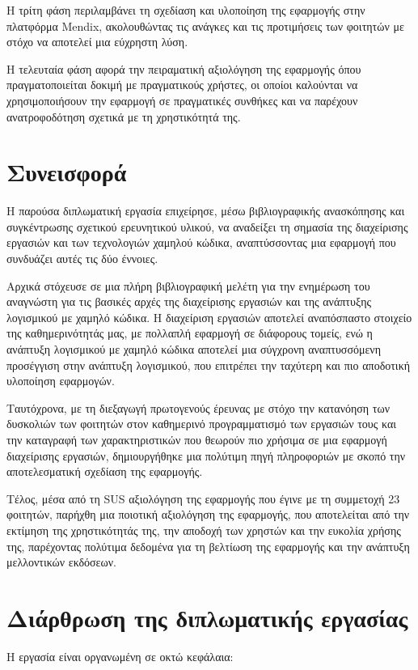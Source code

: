 		Η τρίτη φάση περιλαμβάνει τη σχεδίαση και υλοποίηση της εφαρμογής στην πλατφόρμα Mendix, ακολουθώντας τις ανάγκες και τις προτιμήσεις των φοιτητών με στόχο να αποτελεί μια εύχρηστη λύση.

		Η τελευταία φάση αφορά την πειραματική αξιολόγηση της εφαρμογής όπου πραγματοποιείται δοκιμή με πραγματικούς χρήστες, οι οποίοι καλούνται να χρησιμοποιήσουν την εφαρμογή σε πραγματικές συνθήκες και να παρέχουν ανατροφοδότηση σχετικά με τη χρηστικότητά της.


	\section{Συνεισφορά}
		Η παρούσα διπλωματική εργασία επιχείρησε, μέσω βιβλιογραφικής ανασκόπησης και συγκέντρωσης σχετικού ερευνητικού υλικού, να αναδείξει τη σημασία της διαχείρισης εργασιών και των τεχνολογιών χαμηλού κώδικα, αναπτύσσοντας μια εφαρμογή που συνδυάζει αυτές τις δύο έννοιες.

		Αρχικά στόχευσε σε μια πλήρη βιβλιογραφική μελέτη για την ενημέρωση του αναγνώστη για τις βασικές αρχές της διαχείρισης εργασιών και της ανάπτυξης λογισμικού με χαμηλό κώδικα. Η διαχείριση εργασιών αποτελεί αναπόσπαστο στοιχείο της καθημερινότητάς μας, με πολλαπλή εφαρμογή σε διάφορους τομείς, ενώ η ανάπτυξη λογισμικού με χαμηλό κώδικα αποτελεί μια σύγχρονη αναπτυσσόμενη προσέγγιση στην ανάπτυξη λογισμικού, που επιτρέπει την ταχύτερη και πιο αποδοτική υλοποίηση εφαρμογών.

		Ταυτόχρονα, με τη διεξαγωγή πρωτογενούς έρευνας με στόχο την κατανόηση των δυσκολιών των φοιτητών στον καθημερινό προγραμματισμό των εργασιών τους και την καταγραφή των χαρακτηριστικών που θεωρούν πιο χρήσιμα σε μια εφαρμογή διαχείρισης εργασιών, δημιουργήθηκε μια πολύτιμη πηγή πληροφοριών με σκοπό την αποτελεσματική σχεδίαση της εφαρμογής.

		Τέλος, μέσα από τη SUS αξιολόγηση της εφαρμογής που έγινε με τη συμμετοχή 23 φοιτητών, παρήχθη μια ποιοτική αξιολόγηση της εφαρμογής, που αποτελείται από την εκτίμηση της χρηστικότητάς της, την αποδοχή των χρηστών και την ευκολία χρήσης της, παρέχοντας πολύτιμα δεδομένα για τη βελτίωση της εφαρμογής και την ανάπτυξη μελλοντικών εκδόσεων.


	\section{Διάρθρωση της διπλωματικής εργασίας}
		Η εργασία είναι οργανωμένη σε οκτώ κεφάλαια:

